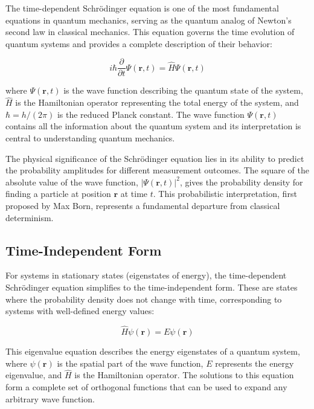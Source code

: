 \documentclass[11pt,a4paper]{article}
\begin{document}
The time-dependent Schrödinger equation is one of the most fundamental equations in quantum mechanics, serving as the quantum analog of Newton's second law in classical mechanics. This equation governs the time evolution of quantum systems and provides a complete description of their behavior:

\begin{equation}
i\hbar \frac{\partial}{\partial t} \Psi(\mathbf{r}, t) = \hat{H} \Psi(\mathbf{r}, t)
\end{equation}

where $\Psi(\mathbf{r}, t)$ is the wave function describing the quantum state of the system, $\hat{H}$ is the Hamiltonian operator representing the total energy of the system, and $\hbar = h/(2\pi)$ is the reduced Planck constant. The wave function $\Psi(\mathbf{r}, t)$ contains all the information about the quantum system and its interpretation is central to understanding quantum mechanics.

The physical significance of the Schrödinger equation lies in its ability to predict the probability amplitudes for different measurement outcomes. The square of the absolute value of the wave function, $|\Psi(\mathbf{r}, t)|^2$, gives the probability density for finding a particle at position $\mathbf{r}$ at time $t$. This probabilistic interpretation, first proposed by Max Born, represents a fundamental departure from classical determinism.

\subsection{Time-Independent Form}

For systems in stationary states (eigenstates of energy), the time-dependent Schrödinger equation simplifies to the time-independent form. These are states where the probability density does not change with time, corresponding to systems with well-defined energy values:

\begin{equation}
\hat{H} \psi(\mathbf{r}) = E \psi(\mathbf{r})
\end{equation}

This eigenvalue equation describes the energy eigenstates of a quantum system, where $\psi(\mathbf{r})$ is the spatial part of the wave function, $E$ represents the energy eigenvalue, and $\hat{H}$ is the Hamiltonian operator. The solutions to this equation form a complete set of orthogonal functions that can be used to expand any arbitrary wave function.
\end{document}
